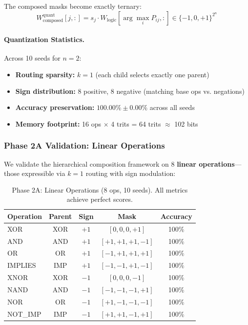 \documentclass[Royal,times,sageh]{sagej}
\begin{document}
The composed masks become exactly ternary:
\begin{equation}
    W_{\text{composed}}^{\text{quant}}[j, :] = s_j \cdot W_{\text{logic}}[\arg\max_i P_{ij}, :] \in \{-1, 0, +1\}^{2^n}
\end{equation}

\paragraph{Quantization Statistics.}
Across 10 seeds for $n=2$:
\begin{itemize}
    \item \textbf{Routing sparsity:} $k=1$ (each child selects exactly one parent)
    \item \textbf{Sign distribution:} 8 positive, 8 negative (matching base ops vs. negations)
    \item \textbf{Accuracy preservation:} $100.00\% \pm 0.00\%$ across all seeds
    \item \textbf{Memory footprint:} 16 ops $\times$ 4 trits = 64 trits $\approx$ 102 bits
\end{itemize}

\subsubsection{Phase 2A Validation: Linear Operations}
\label{sec:phase2a_validation}

We validate the hierarchical composition framework on 8 \textbf{linear operations}---those expressible via $k=1$ routing with sign modulation:

\begin{table}[t]
\centering
\caption{Phase 2A: Linear Operations (8 ops, 10 seeds). All metrics achieve perfect scores.}
\label{tab:phase2a}
\small
\begin{tabular}{lcccc}
\toprule
\textbf{Operation} & \textbf{Parent} & \textbf{Sign} & \textbf{Mask} & \textbf{Accuracy} \\
\midrule
XOR & XOR & $+1$ & $[0, 0, 0, +1]$ & 100\% \\
AND & AND & $+1$ & $[+1, +1, +1, -1]$ & 100\% \\
OR & OR & $+1$ & $[-1, +1, +1, +1]$ & 100\% \\
IMPLIES & IMP & $+1$ & $[-1, -1, +1, -1]$ & 100\% \\
XNOR & XOR & $-1$ & $[0, 0, 0, -1]$ & 100\% \\
NAND & AND & $-1$ & $[-1, -1, -1, +1]$ & 100\% \\
NOR & OR & $-1$ & $[+1, -1, -1, -1]$ & 100\% \\
NOT\_IMP & IMP & $-1$ & $[+1, +1, -1, +1]$ & 100\% \\
\bottomrule
\end{tabular}
\end{table}
\end{document}
